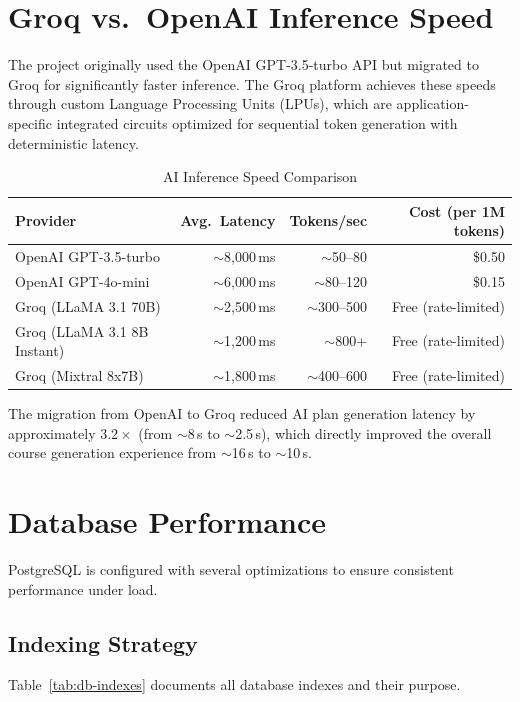 \documentclass[12pt,a4paper]{report}
\begin{document}
\section{Groq vs.\ OpenAI Inference Speed}
The project originally used the OpenAI GPT-3.5-turbo API but migrated to Groq for significantly faster inference. The Groq platform achieves these speeds through custom Language Processing Units (LPUs), which are application-specific integrated circuits optimized for sequential token generation with deterministic latency.

\begin{table}[H]
\centering
\caption{AI Inference Speed Comparison}
\label{tab:ai-speed}
\begin{tabular}{l r r r}
\toprule
\textbf{Provider}              & \textbf{Avg.\ Latency} & \textbf{Tokens/sec} & \textbf{Cost (per 1M tokens)} \\
\midrule
OpenAI GPT-3.5-turbo           & $\sim$8{,}000\,ms       & $\sim$50--80   & \$0.50  \\
OpenAI GPT-4o-mini             & $\sim$6{,}000\,ms       & $\sim$80--120  & \$0.15  \\
Groq (LLaMA 3.1 70B)           & $\sim$2{,}500\,ms       & $\sim$300--500 & Free (rate-limited) \\
Groq (LLaMA 3.1 8B Instant)    & $\sim$1{,}200\,ms       & $\sim$800+     & Free (rate-limited) \\
Groq (Mixtral 8x7B)            & $\sim$1{,}800\,ms       & $\sim$400--600 & Free (rate-limited) \\
\bottomrule
\end{tabular}
\end{table}

The migration from OpenAI to Groq reduced AI plan generation latency by approximately $3.2\times$ (from $\sim$8\,s to $\sim$2.5\,s), which directly improved the overall course generation experience from $\sim$16\,s to $\sim$10\,s.

\section{Database Performance}
PostgreSQL is configured with several optimizations to ensure consistent performance under load.

\subsection{Indexing Strategy}
Table~\ref{tab:db-indexes} documents all database indexes and their purpose.
\end{document}

